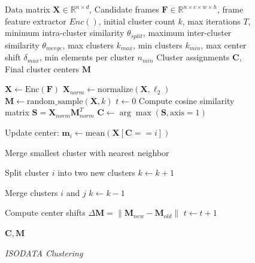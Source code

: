 \begin{figure}[htbp] 
    \centering
    \begin{minipage}{\textwidth} 
\begin{algorithm}[H] 
    \caption{\emph{ISODATA Clustering}}
    \begin{algorithmic}[1]
        \Require Data matrix $\mathbf{X} \in \mathbb{R}^{n \times d}$, Candidate frames $\mathbf{F} \in \mathbb{R}^{n \times c \times w \times h}$, frame feature extractor $Enc()$, initial cluster count $k$, max iterations $T$, minimum intra-cluster similarity $\theta_{split}$, maximum inter-cluster similarity $\theta_{merge}$, max clusters $k_{max}$, min clusters $k_{min}$, max center shift $\delta_{max}$, min elements per cluster $n_{min}$
        \Ensure Cluster assignments $\mathbf{C}$, Final cluster centers $\mathbf{M}$

        \State $\mathbf{X} \gets \text{Enc}(\mathbf{F})$
        \State $\mathbf{X}_{norm} \gets \text{normalize}(\mathbf{X}, \ell_2)$
        \State $\mathbf{M} \gets \text{random\_sample}(\mathbf{X}, k)$
        \State $t \gets 0$
        \Repeat
            \State Compute cosine similarity matrix $\mathbf{S} = \mathbf{X}_{norm} \mathbf{M}_{norm}^T$
            \State $\mathbf{C} \gets \arg\max(\mathbf{S}, \text{axis}=1)$ 
            
                \State Update center: $\mathbf{m}_i \gets \text{mean}(\mathbf{X}[\mathbf{C}==i])$
            \EndFor
            
                \State Merge smallest cluster with nearest neighbor 
            \EndIf
            
                    \State Split cluster $i$ into two new clusters 
                    \State $k \gets k + 1$
                \EndIf
            \EndFor
            
                    \State Merge clusters $i$ and $j$ 
                    \State $k \gets k - 1$
                \EndIf
            \EndFor
            
            \State Compute center shifts $\Delta \mathbf{M} = \|\mathbf{M}_{new} - \mathbf{M}_{old}\|$
            \State $t \gets t + 1$
        
        \State \Return $\mathbf{C}, \mathbf{M}$
    \end{algorithmic}
\label{alg_isodata}
\end{algorithm}
    \end{minipage}
\end{figure}


